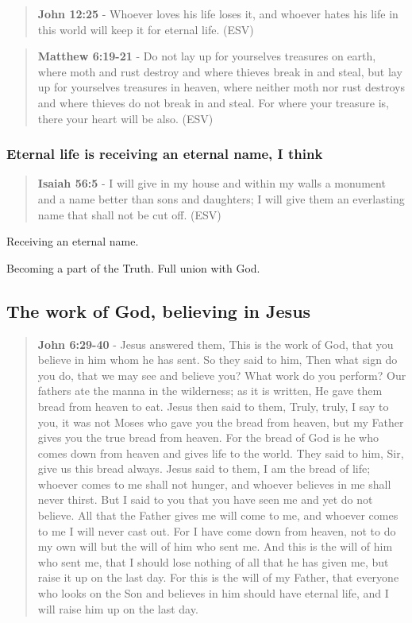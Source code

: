\documentclass[11pt]{article}
\begin{document}
\begin{quote}
\textbf{John 12:25} - Whoever loves his life loses it, and whoever hates his life in this world will keep it for eternal life. (ESV)
\end{quote}

\begin{quote}
\textbf{Matthew 6:19-21} - Do not lay up for yourselves treasures on earth, where moth and rust destroy and where thieves break in and steal, but lay up for yourselves treasures in heaven, where neither moth nor rust destroys and where thieves do not break in and steal. For where your treasure is, there your heart will be also. (ESV)
\end{quote}

\subsubsection{Eternal life is receiving an eternal name, I think}
\label{sec:org07d5642}
\begin{quote}
\textbf{Isaiah 56:5} - I will give in my house and within my walls a monument and a name better than sons and daughters; I will give them an everlasting name that shall not be cut off. (ESV)
\end{quote}

Receiving an eternal name.

Becoming a part of the Truth.
Full union with God.

\subsection{The work of God, believing in Jesus}
\label{sec:org7291c55}
\begin{quote}
\textbf{John 6:29-40} - Jesus answered them, This is the work of God, that you believe in him whom he has sent. So they said to him, Then what sign do you do, that we may see and believe you? What work do you perform? Our fathers ate the manna in the wilderness; as it is written, He gave them bread from heaven to eat. Jesus then said to them, Truly, truly, I say to you, it was not Moses who gave you the bread from heaven, but my Father gives you the true bread from heaven. For the bread of God is he who comes down from heaven and gives life to the world. They said to him, Sir, give us this bread always. Jesus said to them, I am the bread of life; whoever comes to me shall not hunger, and whoever believes in me shall never thirst. But I said to you that you have seen me and yet do not believe. All that the Father gives me will come to me, and whoever comes to me I will never cast out. For I have come down from heaven, not to do my own will but the will of him who sent me. And this is the will of him who sent me, that I should lose nothing of all that he has given me, but raise it up on the last day. For this is the will of my Father, that everyone who looks on the Son and believes in him should have eternal life, and I will raise him up on the last day.
\end{quote}
\end{document}
